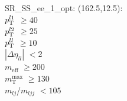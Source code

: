 SR\_SS\_ee\_1\_opt: (162.5,12.5): \\
$p_{\text{T}}^{l1}$ $\geq 40$ \\
$p_{\text{T}}^{l2}$ $\geq 25$ \\
$p_{\text{T}}^{ll}$ $\geq 10$ \\
$|\Delta\eta_{ll}|$ $<2$ \\
$m_{\text{eff}}$ $\geq 200$ \\
$m_{\text{T}}^{\text{max}}$ $\geq 130$ \\
$m_{lj}$/$m_{ljj}$ $<105$ \\

